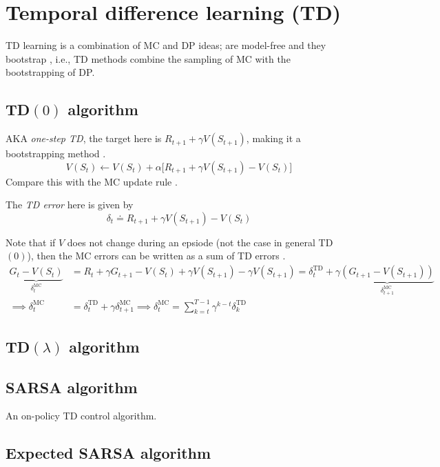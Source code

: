 \section{Temporal difference learning (TD)}

TD learning is a combination of MC and DP ideas; are model-free  and they bootstrap , i.e., TD methods combine the sampling of MC with the bootstrapping of DP.

\subsection{TD\texorpdfstring{\( (0) \)}{ (0) } algorithm}

AKA \textit{one-step TD}, the target here is \( R_{t+1} + \gamma V(S_{t+1}) \), making it a bootstrapping method .
\begin{equation}
    V(S_t) \leftarrow V(S_t) + \alpha \Big[ R_{t+1} + \gamma V(S_{t+1}) - V(S_t) \Big]
\end{equation}
Compare this with the MC update rule .

The \textit{TD error} here is given by
\begin{equation}\label{eq:td-error-TD0}
    \delta_t \doteq R_{t+1} + \gamma V(S_{t+1}) - V(S_t)
\end{equation}

Note that if \( V \) does not change during an epsiode (not the case in general TD\( (0) \)), then the MC errors  can be written as a sum of TD errors .
\begin{align*}
    \underbrace{ G_t - V(S_t) }_{\delta_{t}^{\text{MC}}}
     & =
    R_t + \gamma G_{t+1} - V(S_t) + \gamma V(S_{t+1}) - \gamma V(S_{t+1})
    =
    \delta_{t}^{\text{TD}} + \gamma \underbrace{ (G_{t+1} - V(S_{t+1})) }_{\delta_{t+1}^{\text{MC}}}
    \\
    \implies
    \delta_{t}^{\text{MC}}
     & =
    \delta_{t}^{\text{TD}} + \gamma \delta_{t+1}^{\text{MC}}
    \implies
    \delta_{t}^{\text{MC}}
    =
    \sum_{k = t}^{T-1} \gamma^{k-t} \delta_{k}^{\text{TD}}
\end{align*}

\subsection{TD\texorpdfstring{\( (\lambda) \)}{ (lambda) } algorithm}

\subsection{SARSA algorithm}

An on-policy TD control algorithm.

\subsection{Expected SARSA algorithm}
